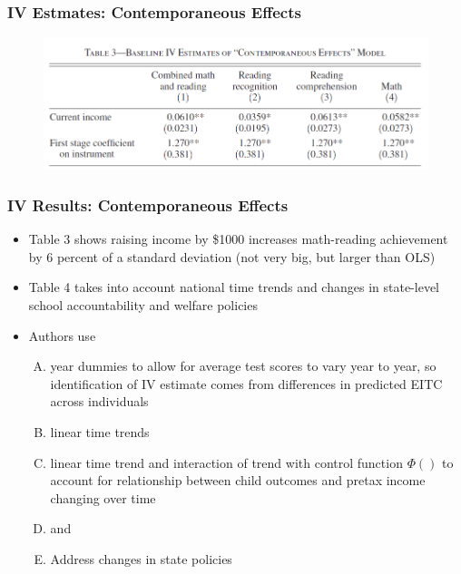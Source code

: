 \documentclass{beamer}
\begin{document}
\begin{frame}
\frametitle{IV Estmates: Contemporaneous Effects}
	\begin{figure}
		\includegraphics[scale=0.4]{../Tables/table2.png}
	\end{figure}
\end{frame}

\begin{frame}
\frametitle{IV Results: Contemporaneous Effects}
\begin{itemize}
	\item Table 3 shows raising income by \$1000 increases math-reading achievement by 6 percent of a standard deviation (not very big, but larger than OLS)
	\item Table 4 takes into account national time trends and changes in state-level school accountability and welfare policies
	\item Authors use 
	\begin{enumerate}[A.]
		\item year dummies to allow for average test scores to vary year to year, so identification of IV estimate comes from differences in predicted EITC across individuals
		\item linear time trends
		\item linear time trend and interaction of trend with control function $\Phi()$ to account for relationship between child outcomes and pretax income changing over time
		\item  and 
		\item Address changes in state policies
	\end{enumerate} 
\end{itemize}
\end{frame}
\end{document}
